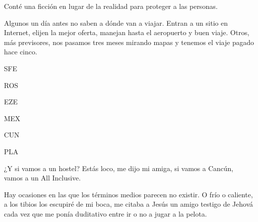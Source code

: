 \documentclass[12pt,twoside,openright,a5paper]{book}
\begin{document}
\cleardoublepage


\vspace{0.5cm}
\hrulefill\hspace{0.2cm} \decofourleft\decofourright \hspace{0.2cm} \hrulefill
\vspace{0.5cm}

Conté una ficción en lugar de la realidad para proteger a las personas.


\vspace{0.5cm}
\hrulefill\hspace{0.2cm} \decofourleft\decofourright \hspace{0.2cm} \hrulefill
\vspace{0.5cm}

Algunos un día antes no saben a dónde van a viajar. Entran a un sitio
en Internet, elijen la mejor oferta, manejan hasta el aeropuerto y buen
viaje. Otros, más previsores, nos pasamos tres meses mirando mapas y
tenemos el viaje pagado hace cinco.


\vspace{0.5cm}
\hrulefill\hspace{0.2cm} \decofourleft\decofourright \hspace{0.2cm} \hrulefill
\vspace{0.5cm}

SFE

ROS

EZE

MEX

CUN

PLA


\vspace{0.5cm}
\hrulefill\hspace{0.2cm} \decofourleft\decofourright \hspace{0.2cm} \hrulefill
\vspace{0.5cm}

¿Y si vamos a un hostel? Estás loco, me dijo mi amiga, si vamos a Cancún,
vamos a un All Inclusive.

Hay ocasiones en las que los términos medios parecen no existir. O frío
o caliente, a los tibios los escupiré de mi boca, me citaba a Jesús un
amigo testigo de Jehová cada vez que me ponía duditativo entre ir o no
a jugar a la pelota.


\vspace{0.5cm}
\hrulefill\hspace{0.2cm} \decofourleft\decofourright \hspace{0.2cm} \hrulefill
\vspace{0.5cm}
\end{document}
